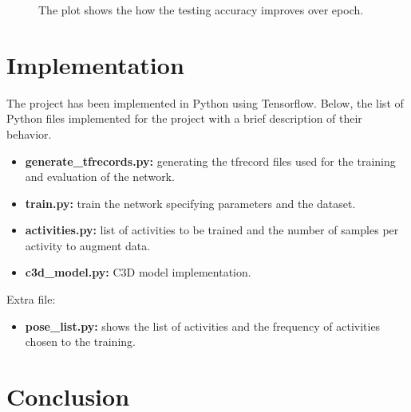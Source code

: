 \documentclass{article}
\begin{document}
\begin{figure}
    \centering
    \caption{The plot shows the how the testing accuracy improves over epoch.}
    \label{fig:testing-accuracy}
\end{figure}


\section{Implementation}

The project has been implemented in Python using Tensorflow. Below, the list of Python files implemented for the project with a brief description of their behavior.

\begin{itemize}
    \item \textbf{generate\_tfrecords.py:} generating the tfrecord files used for the training and evaluation of the network.
    \item \textbf{train.py:} train the network specifying parameters and the dataset.
    \item \textbf{activities.py:} list of activities to be trained and the number of samples per activity to augment data.
    \item \textbf{c3d\_model.py:} C3D model implementation.
\end{itemize}

Extra file:

\begin{itemize}
    \item \textbf{pose\_list.py:} shows the list of activities and the frequency of activities chosen to the training.
\end{itemize}


\section{Conclusion}



\clearpage



\end{document}
